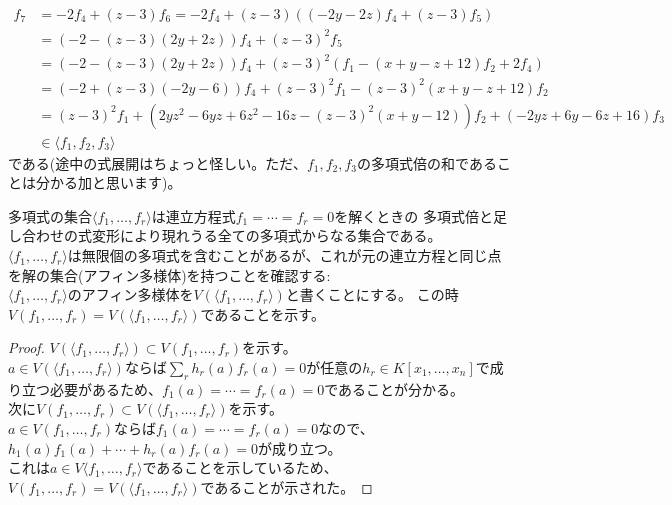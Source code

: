 \begin{frame}
	\begin{align*}
		f_7 & = -2f_4+(z-3)f_6=-2f_4+(z-3)((-2y-2z)f_4+(z-3)f_5)                      \\
		    & = (-2-(z-3)(2y+2z))f_4+(z-3)^2f_5                                       \\
		    & = (-2-(z-3)(2y+2z))f_4+(z-3)^2(f_1-(x+y-z+12)f_2+2f_4)                  \\
		    & = (-2+(z-3)(-2y-6))f_4+(z-3)^2f_1-(z-3)^2(x+y-z+12)f_2                  \\
		    & = (z-3)^2f_1+(2yz^2-6yz+6z^2-16z-(z-3)^2(x+y-12))f_2+(-2yz+6y-6z+16)f_3 \\
		    & \in \langle f_1, f_2, f_3\rangle
	\end{align*}
	である(途中の式展開はちょっと怪しい。ただ、$f_1,f_2,f_3$の多項式倍の和であることは分かる加と思います)。
\end{frame}

\begin{frame}
	多項式の集合$\langle f_1,\ldots,f_r\rangle$は連立方程式$f_1=\cdots=f_r=0$を解くときの
	多項式倍と足し合わせの式変形により現れうる全ての多項式からなる集合である。 \\
	$\langle f_1,\ldots,f_r\rangle$は無限個の多項式を含むことがあるが、これが元の連立方程と同じ点を解の集合(アフィン多様体)を持つことを確認する: \\
	$\langle f_1,\ldots,f_r\rangle$のアフィン多様体を$V(\langle f_1,\ldots,f_r\rangle)$と書くことにする。
	この時$V(f_1,\ldots,f_r)=V(\langle f_1,\ldots,f_r\rangle)$であることを示す。 \\

	\begin{proof}
		$V(\langle f_1,\ldots,f_r\rangle) \subset V(f_1,\ldots,f_r)$を示す。 \\
		$a \in V(\langle f_1,\ldots,f_r\rangle)$ならば$\sum_r h_r(a) f_r(a) = 0$が任意の$h_r \in K[x_1,\ldots, x_n]$で成り立つ必要があるため、$f_1(a)=\cdots=f_r(a)=0$であることが分かる。\\

		次に$V(f_1,\ldots,f_r) \subset V(\langle f_1,\ldots,f_r\rangle)$を示す。\\
		$a \in V(f_1,\ldots,f_r)$ならば$f_1(a)=\cdots=f_r(a)=0$なので、$h_1(a)f_1(a)+\cdots+h_r(a)f_r(a)=0$が成り立つ。\\
		これは$a \in V\langle f_1,\ldots,f_r\rangle$であることを示しているため、
		$V(f_1,\ldots,f_r)=V(\langle f_1,\ldots,f_r\rangle)$であることが示された。
	\end{proof}

\end{frame}

